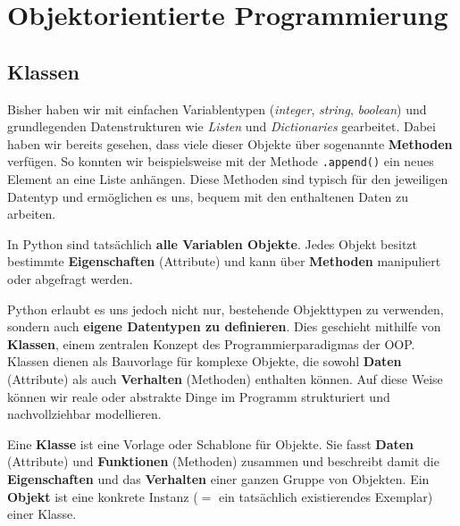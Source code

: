 \chapter{Objektorientierte Programmierung}\label{ch:K07_Klassen}
\section{Klassen}
\label{sec:classes}
Bisher haben wir mit einfachen Variablentypen (\textit{integer}, \textit{string}, \textit{boolean}) und grundlegenden Datenstrukturen wie \textit{Listen} und \textit{Dictionaries} gearbeitet. Dabei haben wir bereits gesehen, dass viele dieser Objekte über sogenannte \textbf{Methoden} verfügen. So konnten wir beispielsweise mit der Methode \lstinline|.append()| ein neues Element an eine Liste anhängen. Diese Methoden sind typisch für den jeweiligen Datentyp und ermöglichen es uns, bequem mit den enthaltenen Daten zu arbeiten.

In Python sind tatsächlich \textbf{alle Variablen Objekte}. Jedes Objekt besitzt bestimmte \textbf{Eigenschaften} (Attribute) und kann über \textbf{Methoden} manipuliert oder abgefragt werden.

Python erlaubt es uns jedoch nicht nur, bestehende Objekttypen zu verwenden, sondern auch \textbf{eigene Datentypen zu definieren}. Dies geschieht mithilfe von \textbf{Klassen}, einem zentralen Konzept des Programmierparadigmas der \gls{OOP}. Klassen dienen als Bauvorlage für komplexe Objekte, die sowohl \textbf{Daten} (Attribute) als auch \textbf{Verhalten} (Methoden) enthalten können. Auf diese Weise können wir reale oder abstrakte Dinge im Programm strukturiert und nachvollziehbar modellieren.


\begin{mydefinition}
Eine \textbf{Klasse} ist eine Vorlage oder Schablone für Objekte. Sie fasst \textbf{Daten} (Attribute) und \textbf{Funktionen} (Methoden) zusammen und beschreibt damit die \textbf{Eigenschaften} und das \textbf{Verhalten} einer ganzen Gruppe von Objekten.
Ein \textbf{Objekt} ist eine konkrete Instanz ($=$ ein tatsächlich existierendes Exemplar) einer Klasse.
\end{mydefinition}

